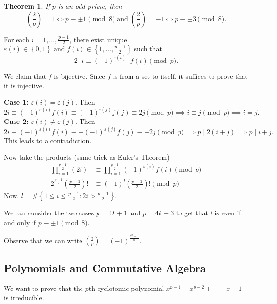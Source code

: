 \documentclass[11pt]{article}
\newtheorem{thm}{Theorem}[section]
\theoremstyle{definition}
\newcommand{\legendre}[2]{\left(\frac{#1}{#2}\right)}
\newcommand{\set}[1]{\left\{ #1 \right\}}
\newcommand{\et}[0]{\text{ and }}
\begin{document}

\begin{thm}
	If $p$ is an odd prime, then
	$$ \legendre{2}{p} = 1 \iff p \equiv \pm1 \pmod{8} \et \legendre{2}{p} = -1 \iff p \equiv \pm3 \pmod{8}. $$
\end{thm}
\proof
	For each $i = 1, ..., \frac{p-1}{2}$, there exist unique $\varepsilon(i)\in\set{0,1} \et f(i)\in\set{1,...,\frac{p-1}{2}}$
	such that $$ 2\cdot i \equiv (-1)^{\varepsilon(i)} \cdot f(i) \pmod{p} . $$
	
	We claim that $f$ is bijective. Since $f$ is from a set to itself, it suffices to prove that it is injective.
	
	\noindent\textbf{Case 1: } $\varepsilon(i) = \varepsilon(j)$.
	Then 
	$$ 2i \equiv (-1)^{\varepsilon(i)} f(i) \equiv (-1)^{\varepsilon(j)} f(j) \equiv 2j \pmod{p} \implies i \equiv j \pmod{p} \implies i = j. $$
	\noindent\textbf{Case 2: } $\varepsilon(i) \neq \varepsilon(j)$. 
	Then 
	$$ 2i \equiv (-1)^{\varepsilon(i)} f(i) \equiv - (-1)^{\varepsilon(j)} f(j) \equiv -2j \pmod{p} \implies p\mid 2(i+j) \implies p \mid i+j. $$
	This leads to a contradiction. 

	Now take the products (same trick as Euler's Theorem)
	\begin{align*}
		\prod_{i=1}^{\frac{p-1}{2}} (2i) &\equiv \prod_{i=1}^{\frac{p-1}{2}} (-1)^{\varepsilon(i)} f(i) \pmod{p} \\
		2^{\frac{p-1}{2}} \left(\frac{p-1}{2}\right)! &\equiv (-1)^{l} \left(\frac{p-1}{2}\right)! \pmod{p}
	\end{align*}
	Now, $l = \#\set{1 \le i \le \frac{p-1}{2} : 2i > \frac{p-1}{2}}$. 

	We can consider the two cases $p = 4k+1$ and $p = 4k+3$ to get that $l$ is even if and only if $p \equiv \pm1 \pmod{8}$. 
\qedhere

Observe that we can write $\legendre{2}{p} = (-1)^\frac{p^2-1}{8}$. 


\subsection{Polynomials and Commutative Algebra}

We want to prove that the $p$th cyclotomic polynomial $x^{p-1} + x^{p-2} + \cdots + x + 1$ is irreducible. 
\end{document}
